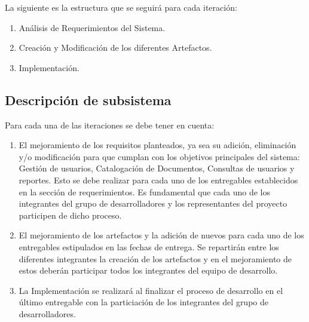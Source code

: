 %
%

La siguiente es la estructura que se seguirá para cada iteración:
\begin{enumerate}
        \item Análisis de Requerimientos del Sistema.
        \item Creación y Modificación de los diferentes Artefactos.
        \item Implementación.
\end{enumerate}
        \subsection{Descripción de subsistema}
        Para cada una de las iteraciones se debe tener en cuenta:
        \begin{enumerate}
                \item El mejoramiento de los requisitos planteados, ya sea su adición, eliminación
                y/o modificación para que cumplan con los objetivos principales del sistema:
                Gestión de usuarios, Catalogación de Documentos, Consultas de usuarios y reportes.
                Esto se debe realizar para cada uno de los entregables establecidos en la sección
                de requerimientos. Es fundamental que cada uno de los integrantes del grupo de
                desarrolladores y los representantes del proyecto participen de dicho proceso.
             
                \item El mejoramiento de los artefactos y la adición de nuevos para cada uno de los
                entregables estipulados en las fechas de entrega. Se repartirán entre los
                diferentes integrantes la creación de los artefactos y en el mejoramiento de estos
                deberán participar todos los integrantes del equipo de desarrollo.
                
                \item La Implementación se realizará al finalizar el proceso de desarrollo en el
                último entregable con la particiación de los integrantes del grupo de 
                desarrolladores.
        \end{enumerate}
        
